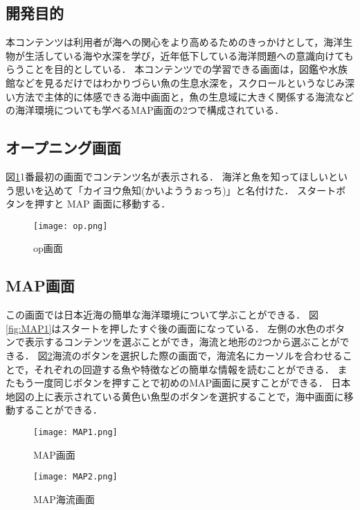 \documentclass[12pt,a4j,titlepage]{ltjsarticle}
\begin{document}
\subsection{開発目的}
本コンテンツは利用者が海への関心をより高めるためのきっかけとして，海洋生物が生活している海や水深を学び，近年低下している海洋問題への意識向けてもらうことを目的としている．
本コンテンツでの学習できる画面は，図鑑や水族館などを見るだけではわかりづらい魚の生息水深を，スクロールというなじみ深い方法で主体的に体感できる海中画面と，魚の生息域に大きく関係する海流などの海洋環境についても学べるMAP画面の2つで構成されている．
\clearpage

\subsection{オープニング画面}
図\ref{fig:op}1番最初の画面でコンテンツ名が表示される．
海洋と魚を知ってほしいという思いを込めて「カイヨウ魚知(かいよううぉっち)」と名付けた．
スタートボタンを押すと MAP 画面に移動する．
\begin{figure}[h]
\begin{center}
\texttt{[image: op.png]}
\end{center}
 \caption{op画面}
 \label{fig:op}
\end{figure}

\subsection{MAP画面}
この画面では日本近海の簡単な海洋環境について学ぶことができる．
図\ref{fig:MAP1}はスタートを押したすぐ後の画面になっている．
左側の水色のボタンで表示するコンテンツを選ぶことができ，海流と地形の2つから選ぶことができる．
図\ref{fig:MAP2}海流のボタンを選択した際の画面で，海流名にカーソルを合わせることで，それぞれの回遊する魚や特徴などの簡単な情報を読むことができる．
またもう一度同じボタンを押すことで初めのMAP画面に戻すことができる．
日本地図の上に表示されている黄色い魚型のボタンを選択することで，海中画面に移動することができる．
\begin{figure}[h]
\centering
\begin{minipage}[b]{0.49\columnwidth}
\centering
\texttt{[image: MAP1.png]}
 \caption{MAP画面}
 \label{fig:MAP1}
\end{minipage}
\begin{minipage}[b]{0.49\columnwidth}
\centering
\texttt{[image: MAP2.png]}
 \caption{MAP海流画面}
 \label{fig:MAP2}
 \end{minipage}
\end{figure}
\end{document}

